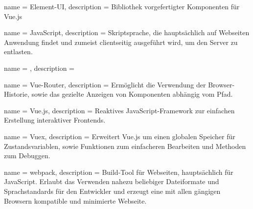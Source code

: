  {
    name = Element-UI,
    description = {
        Bibliothek vorgefertigter Komponenten für Vue.js
    }
}

 {
    name = JavaScript,
    description = {
        Skriptsprache, die hauptsächlich auf Webseiten Anwendung findet und zumeist clientseitig ausgeführt wird, um den Server zu entlasten.
    }
}

\newglossaryentry{} {
    name = ,
    description = {
        
    }
}

 {
    name = Vue-Router,
    description = {
        Ermöglicht die Verwendung der Browser-Historie, sowie das gezielte Anzeigen von Komponenten abhängig vom Pfad.
    }
}

 {
    name = Vue.js,
    description = {
        Reaktives JavaScript-Framework zur einfachen Erstellung interaktiver Frontends.
    }
}

 {
    name = Vuex,
    description = {
        Erweitert Vue.js um einen globalen Speicher für Zustandsvariablen, sowie Funktionen zum einfacheren Bearbeiten und Methoden zum Debuggen.
    }
}

 {
    name = webpack,
    description = {
        Build-Tool für Webseiten, hauptsächlich für JavaScript. Erlaubt das Verwenden nahezu beliebiger Dateiformate und Sprachstandards für den Entwickler und erzeugt eine mit allen gängigen Browsern kompatible und minimierte Webseite.
    }
}